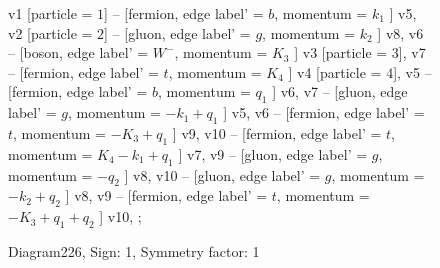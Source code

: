 \documentclass{revtex4}
\begin{document}
\begin{figure}[!htb]
\begin{center}
{    %
v1 [particle = \(1\)] -- [fermion, edge label' = \(b\), momentum = \(k_{1}\) ] v5, 
v2 [particle = \(2\)] -- [gluon, edge label' = \(g\), momentum = \(k_{2}\) ] v8, 
v6 -- [boson, edge label' = \(W^{-}\), momentum = \(K_{3}\) ] v3 [particle = \(3\)], 
v7 -- [fermion, edge label' = \(t\), momentum = \(K_{4}\) ] v4 [particle = \(4\)], 
v5 -- [fermion, edge label' = \(b\), momentum = \(q_{1}\) ] v6, 
v7 -- [gluon, edge label' = \(g\), momentum = \(-k_{1} + q_{1}\) ] v5, 
v6 -- [fermion, edge label' = \(t\), momentum = \(-K_{3} + q_{1}\) ] v9, 
v10 -- [fermion, edge label' = \(t\), momentum = \(K_{4} - k_{1} + q_{1}\) ] v7, 
v9 -- [gluon, edge label' = \(g\), momentum = \(-q_{2}\) ] v8, 
v10 -- [gluon, edge label' = \(g\), momentum = \(-k_{2} + q_{2}\) ] v8, 
v9 -- [fermion, edge label' = \(t\), momentum = \(-K_{3} + q_{1} + q_{2}\) ] v10, 
};
\end{center}
\caption{Diagram226, Sign: 1, Symmetry factor: 1}
\end{figure}
\newpage
\end{document}
